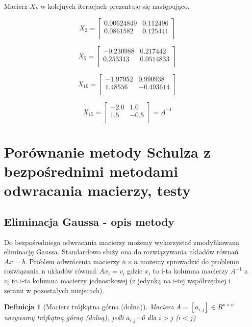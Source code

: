 \documentclass[11pt,a4paper]{article}
\newtheorem{defn}{Definicja}
\begin{document}
  

    Macierz $X_k$ w kolejnych iteracjach prezentuje się następująco.

    $$ X_2 = 
            \left[
                \begin{array}{cc}
                    0.00624849 &  0.112496 \\
                    0.0861582  &  0.125441 \\
                \end{array}
            \right]
    $$

    $$ X_5 = 
            \left[
                \begin{array}{cc}
                    -0.230988 & 0.217442 \\
                    0.253343 & 0.0514833 \\
                \end{array}
            \right]
    $$

    $$ X_{10} = 
            \left[
                \begin{array}{cc}
                    -1.97952 &  0.990938 \\
                    1.48556 & -0.493614 \\
                \end{array}
            \right]
    $$
    
    $$ X_{15} = 
            \left[
                \begin{array}{cc}
                    -2.0  & 1.0 \\
                    1.5 & -0.5 \\
                \end{array}
            \right] = A^{-1}
    $$



    \section{Porównanie metody Schulza z bezpośrednimi metodami odwracania macierzy, testy}
    \subsection{Eliminacja Gaussa - opis metody}
    Do bezpośredniego odwracania macierzy możemy wykorzystać zmodyfikowaną eliminację Gaussa. Standardowo służy ona do rozwiązywania układów równań $Ax=b$. Problem odwrócenia macierzy $n \times n$ możemy sprowadzić do problemu rozwiązania n układów równań $Ax_i=v_i$ gdzie $x_i$ to i-ta kolumna macierzy $A^{-1}$ a $v_i$ to i-ta kolumna macierzy jednostkowej (z jedynką na i-tej współrzędnej i zerami w pozostałych miejscach).\\
    \begin{defn}[Macierz trójkątna górna (dolna)]
        Macierz $A=[a_{i,j}] \in R^{n \times n}$ nazywamy trójkątną górną (dolną), jeśli $a_{i,j}$=0 dla $i>j$ ($i<j$)
    \end{defn}
    
\end{document}
